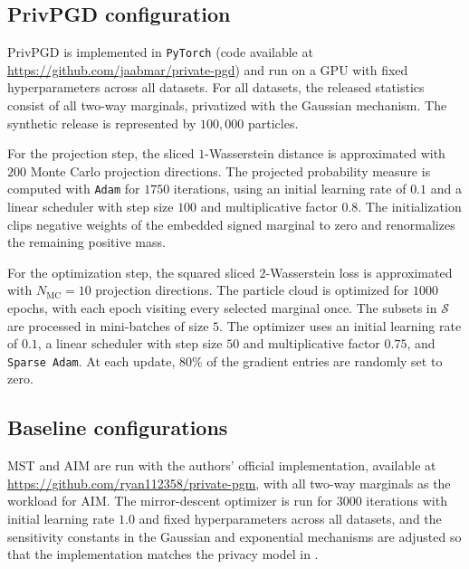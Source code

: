 \subsection{PrivPGD configuration}
PrivPGD is implemented in \texttt{PyTorch} (code available at \url{https://github.com/jaabmar/private-pgd}) and run on a GPU with fixed hyperparameters across all datasets. For all datasets, the released statistics consist of all two-way marginals, privatized with the Gaussian mechanism. The synthetic release is represented by \(100{,}000\) particles.

For the projection step, the sliced \(1\)-Wasserstein distance is approximated with \(200\) Monte Carlo projection directions. The projected probability measure is computed with \texttt{Adam} for \(1750\) iterations, using an initial learning rate of \(0.1\) and a linear scheduler with step size \(100\) and multiplicative factor \(0.8\). The initialization clips negative weights of the embedded signed marginal to zero and renormalizes the remaining positive mass.

For the optimization step, the squared sliced \(2\)-Wasserstein loss is approximated with \(N_{\mathrm{MC}} = 10\) projection directions. The particle cloud is optimized for \(1000\) epochs, with each epoch visiting every selected marginal once. The subsets in \(\mathcal{S}\) are processed in mini-batches of size \(5\). The optimizer uses an initial learning rate of \(0.1\), a linear scheduler with step size \(50\) and multiplicative factor \(0.75\), and \texttt{Sparse Adam}. At each update, \(80\%\) of the gradient entries are randomly set to zero.

\subsection{Baseline configurations}
MST and AIM are run with the authors' official implementation, available at \url{https://github.com/ryan112358/private-pgm}, with all two-way marginals as the workload for AIM. The mirror-descent optimizer is run for \(3000\) iterations with initial learning rate \(1.0\) and fixed hyperparameters across all datasets, and the sensitivity constants in the Gaussian and exponential mechanisms are adjusted so that the implementation matches the privacy model in .

